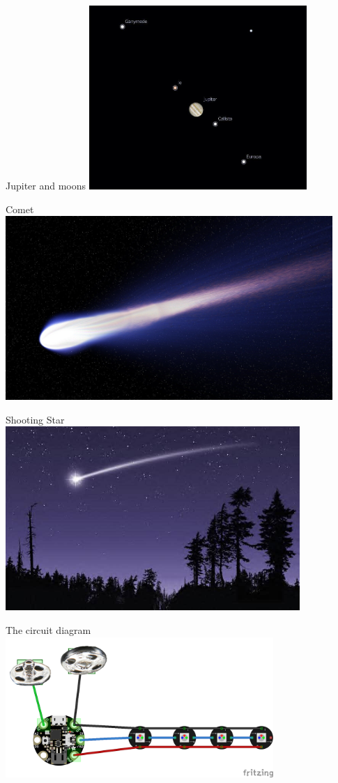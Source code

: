 \documentclass[aspectratio=169]{beamer}
\begin{document}
\begin{frame}[fragile]{Jupiter and moons}
\includegraphics[height=2.75in]{Jupiter-and-moons-58b82f8c3df78c060e64eb8b.jpg}
\end{frame}
\begin{frame}[fragile]{Comet}
\includegraphics[height=2.75in]{comet.jpg}
\end{frame}
\begin{frame}[fragile]{Shooting Star}
\includegraphics[height=2.75in]{shooting-star-1756306537.jpg}
\end{frame}
\begin{frame}[fragile]{The circuit diagram}
\includegraphics[width=4in]{CircuitDiagram_bb.png}
\end{frame}
\end{document}

